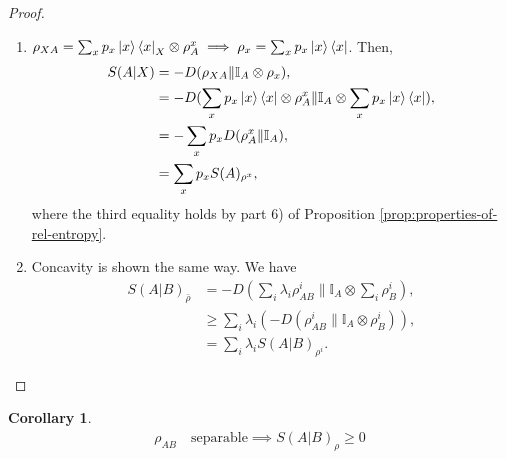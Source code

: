 \documentclass[notoc]{tufte-book}
\newtheorem{corollary}[theorem]{Corollary}
\begin{document}
\begin{proof}
\begin{enumerate}
    \item $\rho_{XA}=\sum_x p_x \ket{x}\bra{x}_X \otimes \rho_A^x \implies \rho_x = \sum_x p_x \ket{x}\bra{x}$. Then, 
    \begin{align}
        S(A|X)&=-D(\rho_{XA}\|\mathbb{I}_A \otimes \rho_x),\\
        &=-D(\sum_x p_x \ket{x}\bra{x}\otimes \rho_A^x \| \mathbb{I}_A \otimes \sum_x p_x \ket{x}\bra{x}),\\
        &= -\sum_x p_x D(\rho_A^x \| \mathbb{I}_A),\\
        &=\sum_x p_x S(A)_{\rho^x},
    \end{align}
    where the third equality holds by part 6) of Proposition \ref{prop:properties-of-rel-entropy}.
    \item Concavity is shown the same way. We have
    \begin{align}
        S(A|B)_{\bar{\rho}} &= -D(\sum_i \lambda_i \rho_{AB}^i \| \mathbb{I}_A \otimes \sum_i \rho_B^i),\\
        &\geq \sum_i \lambda_i (-D(\rho_{AB}^i \| \mathbb{I}_A \otimes \rho_B^i)), \\
        &=\sum_i \lambda_i S(A|B)_{\rho^i}.
    \end{align}
\end{enumerate}
\end{proof}

\begin{tcolorbox}[colframe=white,breakable, colback=black!5, arc=0pt, outer arc=0pt]
\begin{corollary}\label{cor:conditional-entropy-separable}
\begin{align}
    \rho_{AB} \quad \text{separable} \implies S(A|B)_{\rho} \geq 0
\end{align}
\end{corollary}
\end{tcolorbox}
\end{document}
